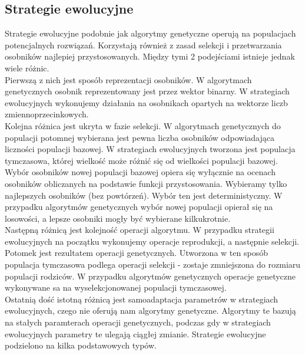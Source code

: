 \documentclass[12pt,a4paper]{article}
\begin{document}
\subsection{Strategie ewolucyjne}
\indent Strategie ewolucyjne podobnie jak algorytmy genetyczne operują na populacjach potencjalnych rozwiązań. Korzystają również z zasad selekcji i przetwarzania osobników najlepiej przystosowanych. Między tymi 2 podejściami istnieje jednak wiele różnic.\\ 
\indent Pierwszą z nich jest sposób reprezentacji osobników. W algorytmach genetycznych osobnik reprezentowany jest przez wektor binarny. W strategiach ewolucyjnych wykonujemy działania na osobnikach opartych na wektorze liczb zmiennoprzecinkowych.\\
\indent Kolejna różnica jest ukryta w fazie selekcji. W algorytmach genetycznych do populacji potomnej wybierana jest pewna liczba osobników odpowiadająca liczności populacji bazowej. W strategiach ewolucyjnych tworzona jest populacja tymczasowa, której wielkość może różnić się od wielkości populacji bazowej. Wybór osobników nowej populacji bazowej opiera się wyłącznie na ocenach osobników obliczanych na podstawie funkcji przystosowania. Wybieramy tylko najlepszych osobników (bez powtórzeń). Wybór ten jest deterministyczny. W przypadku algorytmów genetycznych wybór nowej populacji opierał się na losowości, a lepsze osobniki mogły być wybierane kilkukrotnie. \\
\indent Następną różnicą jest kolejność operacji algorytmu. W przypadku strategii ewolucyjnych na początku wykonujemy operacje reprodukcji, a następnie selekcji. Potomek jest rezultatem operacji genetycznych. Utworzona w ten sposób populacja tymczasowa podlega operacji selekcji - zostaje zmniejszona do rozmiaru populacji rodziców. W przypadku algorytmów genetycznych operacje genetyczne wykonywane sa na wyselekcjonowanej populacji tymczasowej.\\
\indent Ostatnią dość istotną różnicą jest samoadaptacja parametrów w strategiach ewolucyjnych, czego nie oferują nam algorytmy genetyczne. Algorytmy te bazują na stałych paramterach operacji genetycznych, podczas gdy w strategiach ewolucyjnych parametry te ulegają ciągłej zmianie. 
\indent Strategie ewolucyjne podzielono na kilka podstawowych typów.
\end{document}

